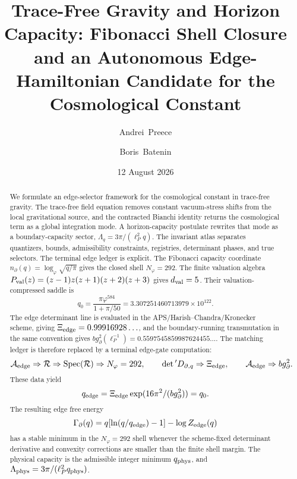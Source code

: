 \documentclass[aps,prd,reprint,nofootinbib,superscriptaddress,floatfix]{revtex4-2}
\numberwithin{equation}{section}
\theoremstyle{definition}
\theoremstyle{plain}
\begin{document}
\title{Trace-Free Gravity and Horizon Capacity: Fibonacci Shell Closure and an Autonomous Edge-Hamiltonian Candidate for the Cosmological Constant}

\author{Andrei~Preece}

\author{Boris~Batenin}

\date{12 August 2026}

\begin{abstract}
We formulate an edge-selector framework for the cosmological constant in
trace-free gravity.  The trace-free field equation removes constant
vacuum-stress shifts from the local gravitational source, and the contracted
Bianchi identity returns the cosmological term as a global integration mode.  A
horizon-capacity postulate rewrites that mode as a boundary-capacity sector,
\(\Lambda_q=3\pi/(\ell_P^2q)\).  The invariant atlas separates quantizers,
bounds, admissibility constraints, registries, determinant phases, and true
selectors.  The terminal edge ledger is explicit.  The Fibonacci capacity
coordinate \(n_\partial(q)=\log_\varphi\sqrt{q/\pi}\) gives the closed shell
\(N_\varphi=292\).  The finite valuation algebra
\(P_{\rm val}(z)=(z-1)z(z+1)(z+2)(z+3)\) gives \(d_{\rm val}=5\).  Their
valuation-compressed saddle is
\[
q_0=\frac{\pi\varphi^{584}}{1+\pi/50}
=3.307251460713979\times10^{122}.
\]
The edge determinant line is evaluated in the APS/Harish--Chandra/Kronecker
scheme, giving
\(\Xi_{\rm edge}=0.99916928\ldots\), and the boundary-running transmutation in
the same convention gives
\(b g_\partial^2(\ell_P^{-1})=0.5597545859987624455\ldots\).  The matching
ledger is therefore replaced by a terminal edge-gate computation:
\[
\mathcal A_{\rm edge}\Rightarrow \mathcal R
\Rightarrow \operatorname{Spec}(\mathcal R)\Rightarrow N_\varphi=292,
\qquad
\det{}'D_{\partial,q}\Rightarrow\Xi_{\rm edge},
\qquad
\mathcal A_{\rm edge}\Rightarrow b g_\partial^2 .
\]
These data yield
\[
q_{\rm edge}
=
\Xi_{\rm edge}\exp(16\pi^2/(b g_\partial^2))
=
q_0.
\]
The resulting edge free energy
\[
\Gamma_\partial(q)=q[\ln(q/q_{\rm edge})-1]-\log Z_{\rm edge}(q)
\]
has a stable minimum in the \(N_\varphi=292\) shell whenever the
scheme-fixed determinant derivative and convexity corrections are smaller than
the finite shell margin.  The physical capacity is the admissible integer
minimum \(q_{\rm phys}\), and
\(\Lambda_{\rm phys}=3\pi/(\ell_P^2q_{\rm phys})\).
\end{abstract}
\end{document}
